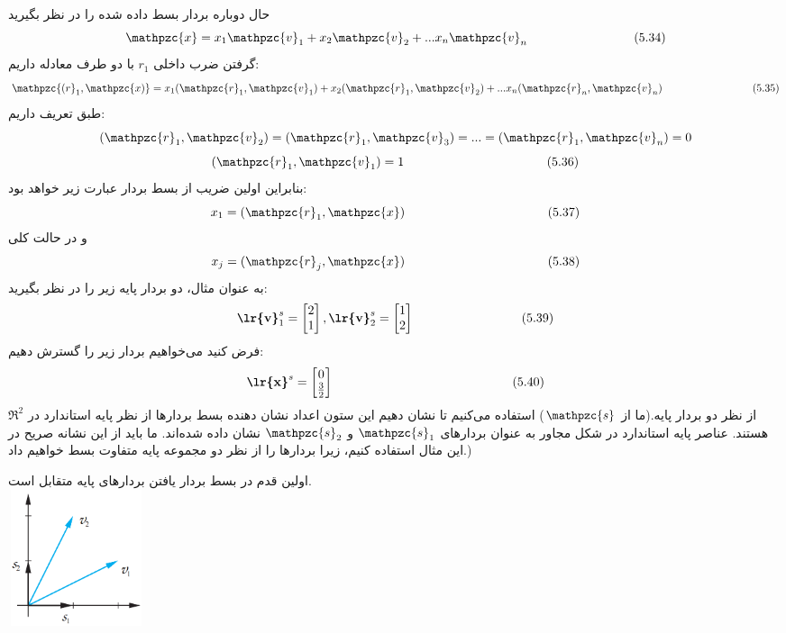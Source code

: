 \documentclass[a4paper,12pt]{report}
\begin{document}
	  حال دوباره بردار بسط داده شده را در نظر بگیرید
	  $$
	  \mathpzc{x}=x_1\mathpzc{v}_1+x_2\mathpzc{v}_2+...x_n\mathpzc{v}_n \hspace{3cm} (5.34)
	  $$
	  گرفتن ضرب داخلی $ r_1 $ با دو طرف معادله  داریم:
	  $$
	  \mathpzc{(r}_1,\mathpzc{x)}=x_1(\mathpzc{r}_1,\mathpzc{v}_1)+x_2(\mathpzc{r}_1,\mathpzc{v}_2)+...x_n(\mathpzc{r}_n,\mathpzc{v}_n) \hspace{3cm} (5.35)
	  $$
	  طبق تعریف داریم:
	  $$
	  (\mathpzc{r}_1,\mathpzc{v}_2)=(\mathpzc{r}_1,\mathpzc{v}_3)=...=(\mathpzc{r}_1,\mathpzc{v}_n)=0
	  $$
	  $$
	  (\mathpzc{r}_1,\mathpzc{v}_1)=1 \hspace{4cm} (5.36)
	  $$
	  بنابراین اولین ضریب از بسط بردار عبارت زیر خواهد بود:
	  $$
	  x_1=(\mathpzc{r}_1,\mathpzc{x}) \hspace{4cm} (5.37)
	  $$
	  و در حالت کلی
	  $$
	  x_j=(\mathpzc{r}_j,\mathpzc{x}) \hspace{4cm} (5.38)
	  $$
	  به عنوان مثال، دو بردار پایه زیر را در نظر بگیرید:
	  $$
	  \textbf{\lr{v}}_1^s=
	  \begin{bmatrix}
	  	2 \\ 1
	  \end{bmatrix}
  	  , \textbf{\lr{v}}_2^s=
  	  \begin{bmatrix}
  	  	1 \\ 2
  	  \end{bmatrix} \hspace{3cm} (5.39)
	  $$
	  فرض کنید می‌خواهیم بردار زیر را گسترش دهیم:
	  $$
	  \textbf{\lr{x}}^s=
	  \begin{bmatrix}
	  	0 \\ \frac{3}{2}
	  \end{bmatrix} \hspace{5cm} (5.40)
	  $$	  
	  از نظر دو بردار پایه.(ما از $ \mathpzc{s} $) استفاده می‌کنیم تا نشان دهیم این ستون اعداد نشان دهنده بسط بردارها از نظر پایه استاندارد در $ \Re^2 $ هستند. عناصر پایه استاندارد در شکل مجاور به عنوان بردارهای
	  $ \mathpzc{s}_1 $ 
	  و
	  $ \mathpzc{s}_2 $
	   نشان داده شده‌اند. ما باید از این نشانه صریح در این مثال استفاده کنیم، زیرا بردارها را از نظر دو مجموعه پایه متفاوت بسط خواهیم داد.)	   
	   
	   اولین قدم در بسط بردار یافتن بردارهای پایه متقابل است.\\
	   
	   \marginpar
	   {	   	
	   	\includegraphics[width=4cm, height=4cm]{133}   
	   }
   
\end{document}
